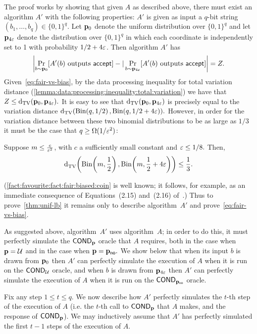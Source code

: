 The proof works by showing that given $A$ as described above, there
must exist an algorithm $A'$ with the following properties:
$A'$ is given as input a $q$-bit string $(b_1,\dots,b_q) \in \{0,1\}^q$.
Let $\mathbf{p}_0$ denote the uniform distribution over $\{0,1\}^q$
and let $\mathbf{p}_{4\varepsilon}$ denote the distribution over
$\{0,1\}^q$ in which each coordinate is independently set to 1
with probability $1/2 + 4 \varepsilon$.
Then algorithm $A'$ has
\begin{equation} \label{eq:fair-vs-bias}
\left|
\Pr_{b \sim \mathbf{p}_0}[A'(b) \text{~outputs~}\textsf{accept}] -
|\Pr_{b \sim \mathbf{p}_{4 \varepsilon}}[A'(b) \text{~outputs~}\textsf{accept}]
\right|
= Z.
\end{equation}
Given~\eqref{eq:fair-vs-bias}, by the data processing inequality for total
variation distance
(\cref{lemma:data:processing:inequality:total:variation})
we have that $Z \leq \operatorname{d}_{\textrm{TV}}(\mathbf{p}_0,\mathbf{p}_{4 \varepsilon}).$
It is easy to see that $\operatorname{d}_{\textrm{TV}}(\mathbf{p}_0,\mathbf{p}_{4\varepsilon})$ is precisely equal to
the variation distance $\operatorname{d}_{\textrm{TV}}(\operatorname{Bin}\!\left( q, 1/2 \right),\operatorname{Bin}\!\left( q, 1/2 + 4 \varepsilon \right)).$
However, in order for the variation distance
between these two binomial distributions to be as large as $1/3$
it must be the case that $q \geq \Omega(1/\varepsilon^2)$:

\begin{fact}\label{fact:favourite:fact:fair:biased:coin}
Suppose $m\leq\frac{c}{\varepsilon^2}$, with $c$ a sufficiently small constant
and $\varepsilon \leq 1/8.$ Then,
\[ {\operatorname{d}_{\textrm{TV}}^{}\!\left({ \operatorname{Bin}\!\left( m, \frac{1}{2} \right) ,  \operatorname{Bin}\!\left( m, \frac{1}{2}+4\varepsilon \right) }\right)} \leq \frac{1}{3}. \]
\end{fact}
(\cref{fact:favourite:fact:fair:biased:coin} is well known; it follows,
for example, as an immediate consequence of Equations~(2.15) and~(2.16)
of~\cite{AdellJodra:06}.)
Thus to prove~\cref{thm:unif-lb} it remains only to describe
algorithm~$A'$ and prove~\cref{eq:fair-vs-bias}.

As suggested above, algorithm~$A'$ uses algorithm~$A$; in order to do this,
it must perfectly
simulate the ${\sf COND}_{\mathbf{p}}$ oracle that $A$ requires, both in the
case when $\mathbf{p} = \mathcal{U}$ and in the case when
$\mathbf{p} = \mathbf{p}_{\text {\textsf{no}}}.$  We show below that when its input $b$
is drawn from $\mathbf{p}_0$ then $A'$ can perfectly simulate the
execution of $A$ when it is run on the ${\sf COND}_{\mathcal{U}}$ oracle,
and when $b$ is drawn from $\mathbf{p}_{4 \varepsilon}$ then
$A'$ can perfectly simulate the execution of $A$ when it is run on the
${\sf COND}_{\mathbf{p}_{\text {\textsf{no}}}}$ oracle.

Fix any step $1 \leq t \leq q$.  We now describe how $A'$ perfectly
simulates the $t$-th step of the execution of $A$ (i.e. the $t$-th call
to ${\sf COND}_{\mathbf{p}}$ that $A$ makes, and the response of ${\sf COND}_{\mathbf{p}}$).
We may inductively assume that $A'$ has perfectly simulated the
first $t-1$ steps of the execution of $A$.

